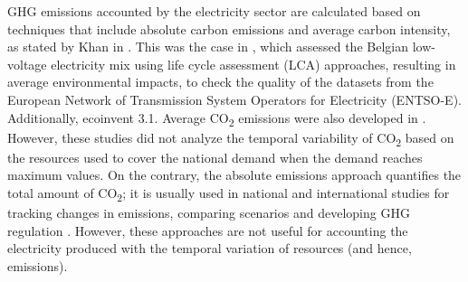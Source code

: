 {{GHG emissions accounted by the electricity sector are calculated based on techniques that include absolute carbon emissions and average carbon intensity, as stated by Khan in \cite{Khan2019CarbonIntensity}. This was the case in \cite{Buyle2019}, which assessed the Belgian low-voltage electricity mix using life cycle assessment (LCA) approaches, resulting in average environmental impacts, to check the quality of the datasets from the European Network of Transmission System Operators for Electricity (ENTSO-E). Additionally, ecoinvent 3.1. Average CO\textsubscript2 emissions were also developed in \cite{Jones2017AnGeneration, PATTUPARA2016152}. However, these studies did not analyze the temporal variability of CO\textsubscript2 based on the resources used to cover the national demand when the demand reaches maximum values. On the contrary, the absolute emissions approach quantifies the total amount of CO\textsubscript2; it is usually used in national and international studies for tracking changes in emissions, comparing scenarios and developing GHG regulation \cite{IEA2018electricity, eun2016does, Richeson2019, ZHANG2013159}. However, these approaches are not useful for accounting the electricity produced with the temporal variation of resources (and hence, emissions).}

}
